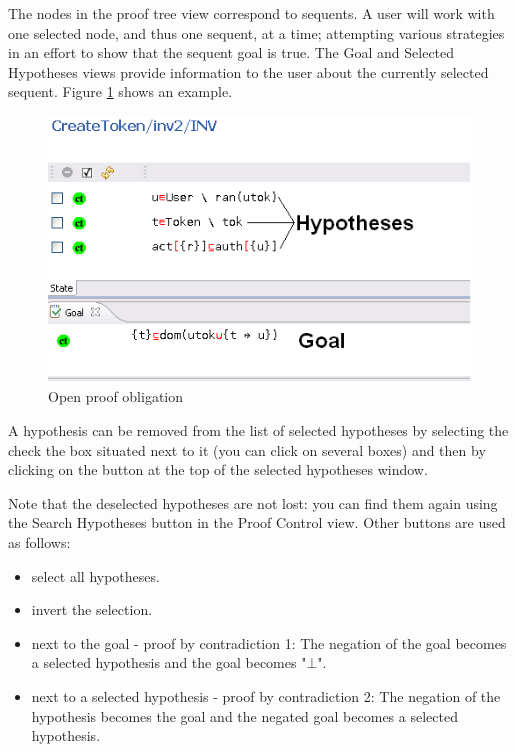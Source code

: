 The nodes in the proof tree view correspond to sequents. A user will work with one selected node, and thus one sequent, at a time; attempting various strategies in an effort to show that the sequent goal is true. The \textsf{Goal} and \textsf{Selected Hypotheses} views provide information to the user about the currently selected sequent. Figure \ref{fig_ref_01_proving_perspective3} shows an example.

\begin{figure}[!h]
\begin{center}
	\includegraphics{img/reference/ref_01_proving_perspective3.png}
	\caption{Open proof obligation}
	\label{fig_ref_01_proving_perspective3}
\end{center}
\end{figure}

A hypothesis can be removed from the list of selected hypotheses by selecting the check the box situated next to it (you can click on several boxes) and then by clicking on the  button at the top of the selected hypotheses window.

Note that the deselected hypotheses are not lost: you can find them again using the \textsf{Search Hypotheses}  button in the Proof Control view. Other buttons are used as follows:

\begin{itemize}
	\item {} select all hypotheses. 
	\item {} invert the selection. 
	\item {} next to the goal - proof by contradiction 1: The negation of the goal becomes a selected hypothesis and the goal becomes "$\bot$". 
	\item {} next to a selected hypothesis - proof by contradiction 2: The negation of the hypothesis becomes the goal and the negated goal becomes a selected hypothesis. 
\end{itemize}

